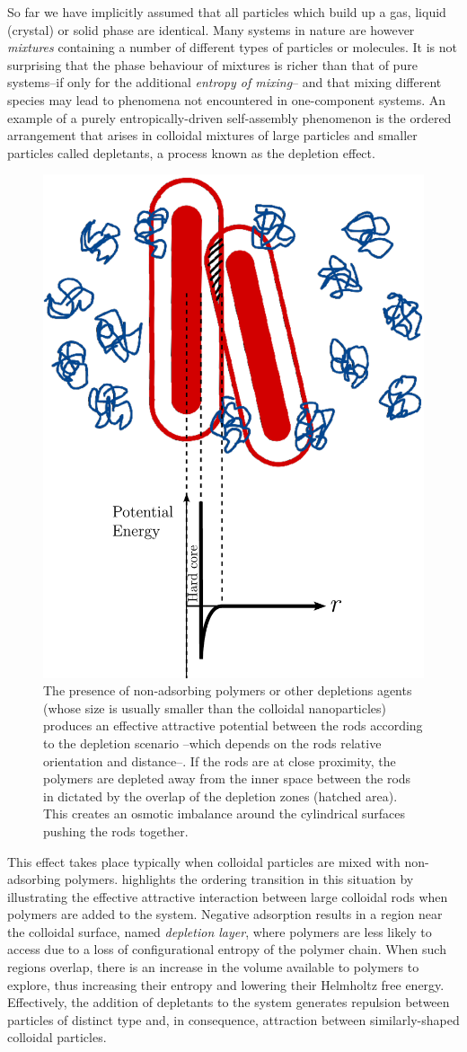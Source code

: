 So far we have implicitly assumed that all particles which build up a gas, liquid (crystal) or solid phase are identical. Many systems in nature are however {\em mixtures} containing a number of different types of particles or molecules. It is not surprising that the phase behaviour of mixtures is richer than that of pure systems--if only for the additional {\em entropy of mixing}-- and that mixing different species may lead to  phenomena not encountered in one-component systems. An example of a purely entropically-driven self-assembly phenomenon is the ordered arrangement that arises in colloidal mixtures of large particles and smaller particles called depletants, a process known as the depletion effect.

\begin{figure}
\includegraphics[width= 0.4 \columnwidth]{figures/chapter-1/depletion}
\caption[The presence of non-adsorbing polymers or other depletion agents (whose size is usually smaller than the colloidal nanoparticles)]{ \label{introfig2} The presence of non-adsorbing polymers or other depletions agents (whose size is usually smaller than the colloidal nanoparticles) produces an effective attractive potential between the rods according to the depletion scenario --which depends on the rods relative orientation and distance--. If the rods are at close proximity, the polymers are depleted away from the inner space between the rods in dictated by the overlap of the depletion zones (hatched area). This creates an osmotic imbalance around the cylindrical surfaces pushing the rods together.  }
\end{figure}

This effect takes place typically when colloidal particles are mixed with non-adsorbing polymers.  highlights the ordering transition in this situation by illustrating the effective attractive interaction between large colloidal rods when polymers are added to the system. Negative adsorption results in a region near the colloidal surface, named {\em depletion layer}, where polymers are less likely to access due to a loss of configurational entropy of the polymer chain. When such regions overlap, there is an increase in the volume available to polymers to explore, thus increasing their entropy and lowering their Helmholtz free energy. Effectively, the addition of depletants to the system generates repulsion between particles of distinct type and, in consequence, attraction between similarly-shaped colloidal particles.

